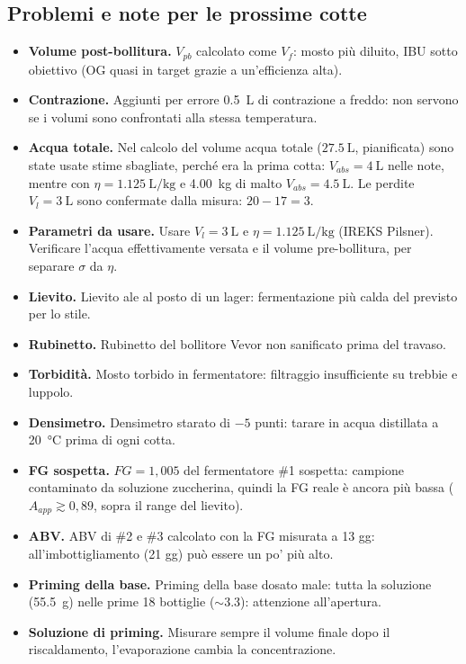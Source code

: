 \subsection*{Problemi e note per le prossime cotte}
\begin{itemize}
  \item \textbf{Volume post-bollitura.} $V_{pb}$ calcolato come $V_f$: mosto più diluito, IBU sotto obiettivo (OG quasi in target grazie a un'efficienza alta).
  \item \textbf{Contrazione.} Aggiunti per errore \SI{0,5}{\liter} di contrazione a freddo: non servono se i volumi sono confrontati alla stessa temperatura.
  \item \textbf{Acqua totale.} Nel calcolo del volume acqua totale ($\SI{27,5}{\liter}$, pianificata) sono state usate stime sbagliate, perché era la prima cotta: $V_{abs} = \SI{4}{\liter}$ nelle note, mentre con $\eta = \SI{1,125}{\liter\per\kilo\gram}$ e \SI{4,00}{\kilo\gram} di malto $V_{abs} = \SI{4,5}{\liter}$. Le perdite $V_l = \SI{3}{\liter}$ sono confermate dalla misura: $20 - 17 = 3$.
  \item \textbf{Parametri da usare.} Usare $V_l = \SI{3}{\liter}$ e $\eta = \SI{1,125}{\liter\per\kilo\gram}$ (IREKS Pilsner). Verificare l'acqua effettivamente versata e il volume pre-bollitura, per separare $\sigma$ da $\eta$.
  \item \textbf{Lievito.} Lievito ale al posto di un lager: fermentazione più calda del previsto per lo stile.
  \item \textbf{Rubinetto.} Rubinetto del bollitore Vevor non sanificato prima del travaso.
  \item \textbf{Torbidità.} Mosto torbido in fermentatore: filtraggio insufficiente su trebbie e luppolo.
  \item \textbf{Densimetro.} Densimetro starato di $-5$ punti: tarare in acqua distillata a \SI{20}{\celsius} prima di ogni cotta.
  \item \textbf{FG sospetta.} $FG = 1{,}005$ del fermentatore \#1 sospetta: campione contaminato da soluzione zuccherina, quindi la FG reale è ancora più bassa ($A_{app} \gtrsim 0{,}89$, sopra il range del lievito).
  \item \textbf{ABV.} ABV di \#2 e \#3 calcolato con la FG misurata a 13 gg: all'imbottigliamento (21 gg) può essere un po' più alto.
  \item \textbf{Priming della base.} Priming della base dosato male: tutta la soluzione (\SI{55,5}{\gram}) nelle prime 18 bottiglie ($\sim$\SI{3,3}{\vol}): attenzione all'apertura.
  \item \textbf{Soluzione di priming.} Misurare sempre il volume finale dopo il riscaldamento, l'evaporazione cambia la concentrazione.
\end{itemize}